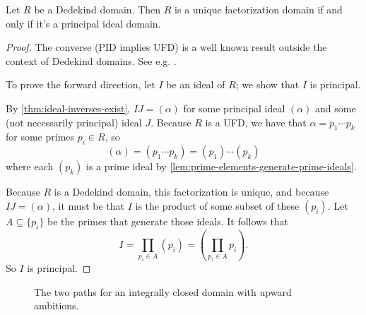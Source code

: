 \begin{theorem}
    \label{thm:dedekind-ufd-implies-pid}
    Let $R$ be a Dedekind domain. Then $R$ is a unique factorization domain if and only if it's a principal ideal domain.
\end{theorem}

\begin{proof}
    The converse (PID implies UFD) is a well known result outside the context of Dedekind domains. See e.g. \textcite{dummit-foote}.

    To prove the forward direction, let $I$ be an ideal of $R$; we show that $I$ is principal.

    By \autoref{thm:ideal-inverses-exist}, $IJ = (\alpha)$ for some principal ideal $(\alpha)$ and some (not necessarily principal) ideal $J$. Because $R$ is a UFD, we have that $\alpha = p_1 \cdots p_k$ for some primes $p_i \in R$, so
    \begin{equation}
        (\alpha) = (p_1 \cdots p_k) = (p_1) \cdots (p_k)
    \end{equation}
    where each $(p_k)$ is a prime ideal by \autoref{lem:prime-elements-generate-prime-ideals}.

    Because $R$ is a Dedekind domain, this factorization is unique, and because $IJ =  (\alpha)$, it must be that $I$ is the product of some subset of these $(p_i)$.
    Let $A \subseteq \{ p_i \}$ be the primes that generate those ideals. It follows that
    \begin{equation}
        I
        = \prod_{p_i \in A} (p_i)
        = \left( \prod_{p_i \in A} p_i \right).
    \end{equation}
    So $I$ is principal.
\end{proof}

\begin{figure}
    \centering
    \caption{The two paths for an integrally closed domain with upward ambitions.}
    \label{fig:dedekind-in-ring-hierarchy}
\end{figure}

